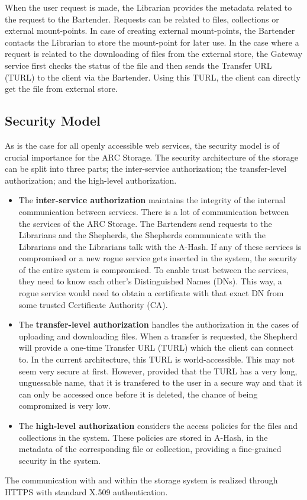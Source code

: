 \documentclass[final]{ieee}
\begin{document}
When the user request is made, the Librarian provides the metadata related
to the request to the Bartender. Requests can be related to
files, collections or external mount-points. In case of creating
external mount-points, the Bartender contacts the Librarian to store
the mount-point for later use. In the case where a request is related
to the downloading of files from the external store, the Gateway service first checks the status of the file
and then sends the Transfer URL (TURL) to the client via the
Bartender. Using this TURL, the client can directly get the file from
external store. %

\subsection{Security Model }
\label{Security Model }

As is the case for all openly accessible web services, the security
model is of crucial importance for the ARC Storage. The security
architecture of the storage can be split into three parts; the
inter-service authorization; the transfer-level authorization; and the
high-level authorization.
\begin{itemize}
\item The \textbf{inter-service authorization} maintains the integrity of the
  internal communication between services. There is a lot of
  communication between the services of the ARC Storage. The
  Bartenders send requests to the Librarians and the Shepherds, the
  Shepherds communicate with the Librarians and the Librarians talk with
  the A-Hash. If any of these services is compromised or a new
  rogue service gets inserted in the system, the security of the
  entire system is compromised. To enable trust between the services,
  they need to know each other's Distinguished Names (DNs). This way,
  a rogue service would need to obtain a certificate with that exact
  DN from some trusted Certificate Authority (CA).
\item The \textbf{transfer-level authorization} handles the
  authorization in the cases of uploading and downloading files. When
  a transfer is requested, the Shepherd will provide a one-time
  Transfer URL (TURL) which the client can connect to. In the
  current architecture, this TURL is world-accessible. This may not seem
  very secure at first. However, provided that the TURL has a very long,
  unguessable name, that it is transfered to the user in a secure way
  and that it can only be accessed once before it is deleted, the
  chance of being compromized is very low.
\item The \textbf{high-level authorization} considers the access
  policies for the files and collections in the system. These policies
  are stored in A-Hash, in the metadata of the corresponding file or
  collection, providing a fine-grained security in the system.
\end{itemize}
The communication with and within the storage system is realized
through HTTPS with standard X.509 authentication.
\end{document}

